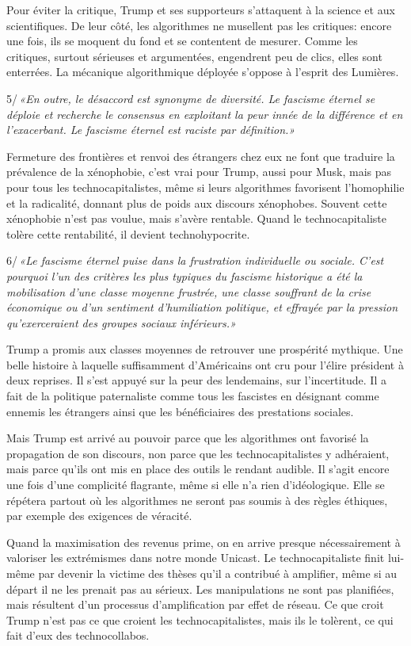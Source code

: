 \documentclass[a5paper, 10pt, twoside]{book}
\begin{document}
Pour éviter la critique, Trump et ses supporteurs s’attaquent à la
science et aux scientifiques. De leur côté, les algorithmes ne musellent
pas les critiques: encore une fois, ils se moquent du fond et se
contentent de mesurer. Comme les critiques, surtout sérieuses et
argumentées, engendrent peu de clics, elles sont enterrées. La mécanique
algorithmique déployée s’oppose à l’esprit des Lumières.

5/\,\emph{«En outre, le désaccord est synonyme de diversité. Le fascisme
éternel se déploie et recherche le consensus en exploitant la peur innée
de la différence et en l’exacerbant. Le fascisme éternel est raciste par
définition.»}

Fermeture des frontières et renvoi des étrangers chez eux ne font que
traduire la prévalence de la xénophobie, c’est vrai pour Trump, aussi
pour Musk, mais pas pour tous les technocapitalistes, même si leurs
algorithmes favorisent l’homophilie et la radicalité, donnant plus de
poids aux discours xénophobes. Souvent cette xénophobie n’est pas
voulue, mais s’avère rentable. Quand le technocapitaliste tolère cette
rentabilité, il devient technohypocrite.

6/\,\emph{«Le fascisme éternel puise dans la frustration individuelle ou
sociale. C’est pourquoi l’un des critères les plus typiques du fascisme
historique a été la mobilisation d’une classe moyenne frustrée, une
classe souffrant de la crise économique ou d’un sentiment d’humiliation
politique, et effrayée par la pression qu’exerceraient des groupes
sociaux inférieurs.»}

Trump a promis aux classes moyennes de retrouver une prospérité
mythique. Une belle histoire à laquelle suffisamment d’Américains ont
cru pour l’élire président à deux reprises. Il s’est appuyé sur la peur
des lendemains, sur l’incertitude. Il a fait de la politique
paternaliste comme tous les fascistes en désignant comme ennemis les
étrangers ainsi que les bénéficiaires des prestations sociales.

Mais Trump est arrivé au pouvoir parce que les algorithmes ont favorisé
la propagation de son discours, non parce que les technocapitalistes y
adhéraient, mais parce qu’ils ont mis en place des outils le rendant
audible. Il s’agit encore une fois d’une complicité flagrante, même si
elle n’a rien d’idéologique. Elle se répétera partout où les algorithmes
ne seront pas soumis à des règles éthiques, par exemple des exigences de
véracité.

Quand la maximisation des revenus prime, on en arrive presque
nécessairement à valoriser les extrémismes dans notre monde Unicast. Le
technocapitaliste finit lui-même par devenir la victime des thèses qu’il
a contribué à amplifier, même si au départ il ne les prenait pas au
sérieux. Les manipulations ne sont pas planifiées, mais résultent d’un
processus d’amplification par effet de réseau. Ce que croit Trump n’est
pas ce que croient les technocapitalistes, mais ils le tolèrent, ce qui
fait d’eux des technocollabos.
\end{document}
